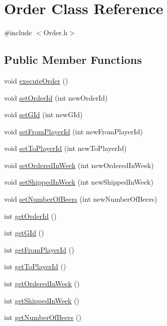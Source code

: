 \hypertarget{classOrder}{}\section{Order Class Reference}
\label{classOrder}


{\ttfamily \#include $<$Order.\+h$>$}

\subsection*{Public Member Functions}
\begin{DoxyCompactItemize}
\item 
void \hyperlink{classOrder_a065c7828b1608d906dc9f2f2cc43ee35}{execute\+Order} ()
\item 
void \hyperlink{classOrder_a1b61f0f2a914b59826f5b4792e8ccc50}{set\+Order\+Id} (int new\+Order\+Id)
\item 
void \hyperlink{classOrder_a9cdffc1001883592ab2bddc4526a29d5}{set\+G\+Id} (int new\+G\+Id)
\item 
void \hyperlink{classOrder_aad96c2cebb1032e899be28bd09610cfa}{set\+From\+Player\+Id} (int new\+From\+Player\+Id)
\item 
void \hyperlink{classOrder_aa4fd3b1330aec093b6022cca63e0633c}{set\+To\+Player\+Id} (int new\+To\+Player\+Id)
\item 
void \hyperlink{classOrder_a2c98b59a17d5fd4094f180b381d0206a}{set\+Ordered\+In\+Week} (int new\+Ordered\+In\+Week)
\item 
void \hyperlink{classOrder_a38114f2b7e6b6d49fb791d2b2adb7378}{set\+Shipped\+In\+Week} (int new\+Shipped\+In\+Week)
\item 
void \hyperlink{classOrder_aa0254aa87207ff328057e5d5b03e4bf0}{set\+Number\+Of\+Beers} (int new\+Number\+Of\+Beers)
\item 
int \hyperlink{classOrder_aa5042da754f07b1876aa63615c5f2983}{get\+Order\+Id} ()
\item 
int \hyperlink{classOrder_a89b55df1654ff4cb9db6608fc88c86ed}{get\+G\+Id} ()
\item 
int \hyperlink{classOrder_a1d6ae1f551053272307fde77c2cffa58}{get\+From\+Player\+Id} ()
\item 
int \hyperlink{classOrder_a212e8294656ab9582dbca89de2e1e4c9}{get\+To\+Player\+Id} ()
\item 
int \hyperlink{classOrder_aed0ea4435169c95ecc05530df91f225a}{get\+Ordered\+In\+Week} ()
\item 
int \hyperlink{classOrder_a7103f60141cf2fefd053aac011dc7613}{get\+Shipped\+In\+Week} ()
\item 
int \hyperlink{classOrder_a88e86300e6c1b4a21e4ea042b60a7220}{get\+Number\+Of\+Beers} ()
\end{DoxyCompactItemize}



